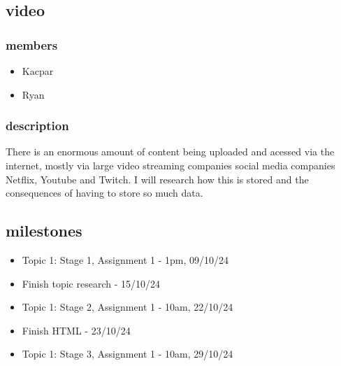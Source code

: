 \documentclass{article}
\begin{document}
\subsection{video}
\subsubsection{members}
\begin{itemize}
    \item Kacpar
    
    \item Ryan
\end{itemize}
\subsubsection{description}
There is an enormous amount of content being uploaded and acessed via the internet, mostly via large video 
streaming companies social media companies Netflix, Youtube and Twitch. I will research
how this is stored and the consequences of having to store so much data.
\subsection{milestones}
\begin{itemize}
    \item Topic 1: Stage 1, Assignment 1 - 1pm, 09/10/24
    \item Finish topic research - 15/10/24
    \item Topic 1: Stage 2, Assignment 1 - 10am, 22/10/24
    \item Finish HTML - 23/10/24
    \item Topic 1: Stage 3, Assignment 1 - 10am, 29/10/24
\end{itemize}
\end{document}
